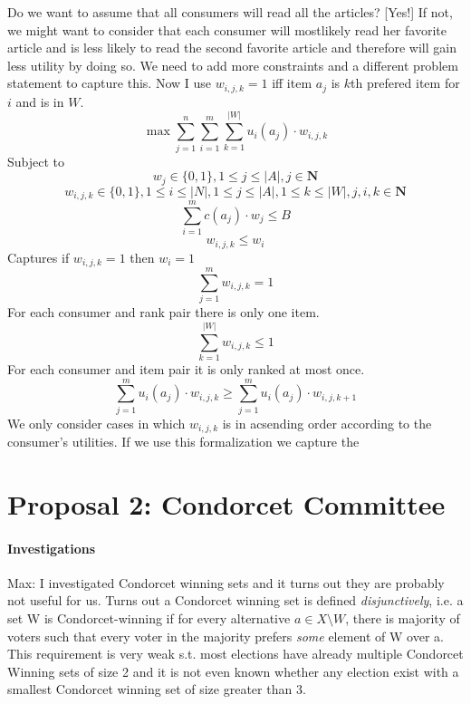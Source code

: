 \documentclass[10pt,a4paper]{article}
\begin{document}
Do we want to assume that all consumers will read all the articles? [Yes!] If not, we might want to consider that each consumer will mostlikely read her favorite article and is less likely to read the second favorite article and therefore will gain less utility by doing so. We need to add more constraints and a different problem statement to capture this. Now I use $w_{i,j,k} = 1$ iff item $a_j$ is $k$th prefered item for $i$ and is in $W$.
\begin{equation}
\max \sum_{j=1}^n \sum_{i=1}^m \sum_{k=1}^{|W|}u_i(a_j)\cdot w_{i,j,k}
\end{equation}
Subject to
\begin{equation}
w_j \in \{0,1\}, 1 \leq j \leq |A|, j \in \mathbf{N}
\end{equation}
\begin{equation}
w_{i,j,k} \in \{0,1\}, 1 \leq i \leq |N|, 1 \leq j \leq |A|, 1 \leq k \leq |W|, j,i,k \in \mathbf{N} 
\end{equation}
\begin{equation}
\sum_{i=1}^m c(a_j)\cdot w_j \leq B 
\end{equation}
\begin{equation}
w_{i,j,k} \leq w_i
\end{equation}
Captures if $w_{i,j,k}=1$ then $w_i=1$
\begin{equation}
\sum_{j=1}^{m} w_{i,j,k}=1
\end{equation}
For each consumer and rank pair there is only one item.
\begin{equation}
\sum_{k=1}^{|W|} w_{i,j,k}\leq 1
\end{equation}
For each consumer and item pair it is only ranked at most once.
\begin{equation}
\sum_{j=1}^{m} u_i(a_j)\cdot w_{i,j,k} \geq \sum_{j=1}^{m} u_i(a_j)\cdot w_{i,j,k+1}
\end{equation}
We only consider cases in which $w_{i,j,k}$ is in acsending order according to the consumer's utilities. If we use this formalization we capture the

\section{Proposal 2: Condorcet Committee}

\paragraph{Investigations}

Max: I investigated Condorcet winning sets and it turns out they are probably not useful for us. Turns out a Condorcet winning set is defined
\emph{disjunctively}, i.e. a set W is Condorcet-winning if for every alternative $a\in X\setminus W$, there is majority of voters such that every
voter in the majority prefers \emph {some} element of W over a. This requirement is very weak s.t. most elections have already multiple Condorcet
Winning sets of size 2 and it is not even known whether any election exist with a smallest Condorcet winning set of size greater than 3.
\end{document}
